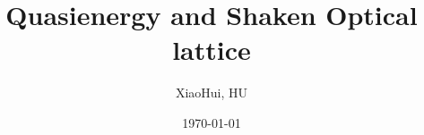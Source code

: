 \documentclass[
 reprint,
 amsmath,amssymb,
 aps,
pra,
floatfix,
]{revtex4-2}
\begin{document}

\title{Quasienergy and Shaken Optical lattice}%

\author{XiaoHui, HU}




\date{\today}%


\maketitle
\end{document}
